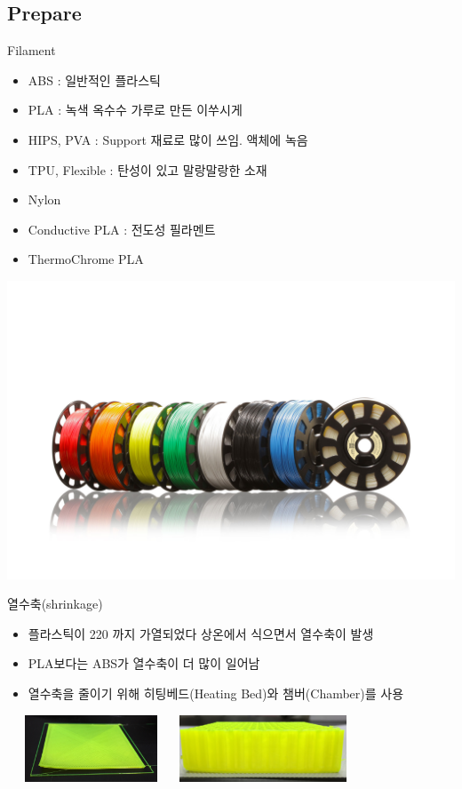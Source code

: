 \documentclass[11pt]{beamer}
\begin{document}
\subsection{Prepare}

\begin{frame}[t]{Filament}\footnotesize
\begin{itemize}
\item ABS : 일반적인 플라스틱
\item PLA : 녹색 옥수수 가루로 만든 이쑤시게
\item HIPS, PVA : Support 재료로 많이 쓰임. 액체에 녹음
\item TPU, Flexible : 탄성이 있고 말랑말랑한 소재
\item Nylon
\item Conductive PLA : 전도성 필라멘트
\item ThermoChrome PLA
\end{itemize}
\raggedleft
\includegraphics[width=0.7\textheight]{./image/10_01.jpg}
\end{frame}



\begin{frame}[t]{열수축(shrinkage)}\footnotesize
\begin{itemize}
\item 플라스틱이 220 까지 가열되었다 상온에서 식으면서 열수축이 발생
\item PLA보다는 ABS가 열수축이  더 많이 일어남
\item 열수축을 줄이기 위해 히팅베드(Heating Bed)와 챔버(Chamber)를 사용
\end{itemize}
\includegraphics[width=5cm, height=2cm]{./image/11_1.JPG} \@ \includegraphics[width=5cm, height=2cm]{./image/11_2.JPG}
\end{frame}
\end{document}
